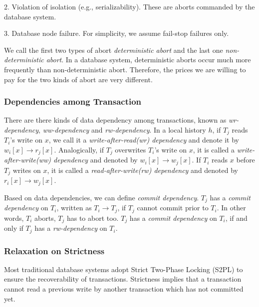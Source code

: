\documentclass[conference]{IEEEtran}
\begin{document}
2. Violation of isolation (e.g., serializability). These are aborts commanded by the database system.

3. Database node failure. For simplicity, we assume fail-stop failures only.

We call the first two types of abort \emph{deterministic abort} and the last one \emph{non-deterministic abort}.
In a database system, deterministic aborts occur much more frequently than non-deterministic abort.
Therefore, the prices we are willing to pay for the two kinds of abort are very different. 

\subsubsection{Dependencies among Transaction}

There are there kinds of data dependency among transactions, known as \emph{wr-dependency}, \emph{ww-dependency} and \emph{rw-dependency}.
In a local history ${h}$, if ${T_j}$ reads ${T_i}$'s write on ${x}$,
we call it a \emph{write-after-read(wr) dependency} and denote it by ${w_i[x] \rightarrow r_j[x]}$.
Analogically, if ${T_j}$ overwrites ${T_i}$'s write on ${x}$, it is called a \emph{write-after-write(ww) dependency} and denoted by ${w_i[x] \rightarrow w_j[x]}$.
If ${T_i}$ reads ${x}$ before ${T_j}$ writes on ${x}$, it is called a \emph{read-after-write(rw) dependency} and denoted by ${r_i[x] \rightarrow w_j[x]}$.

Based on data dependencies, we can define \emph{commit dependency}. ${T_j}$ has a \emph{commit dependency} on ${T_i}$, written as ${T_i \rightarrow T_j}$, if ${T_j}$ cannot commit prior to ${T_i}$.
In other words, ${T_i}$ aborts, ${T_j}$ has to abort too. ${T_j}$ has a \emph{commit dependency} on ${T_i}$, if and only if ${T_j}$ has a \emph{rw-dependency} on ${T_i}$.


\subsubsection{Relaxation on Strictness}

Most traditional database systems adopt Strict Two-Phase Locking (S2PL) \cite{DBLP:conf/vldb/Raz92} to ensure the recoverability of transactions.
Strictness implies that a transaction cannot read a previous write by another transaction which has not committed yet.
\end{document}
